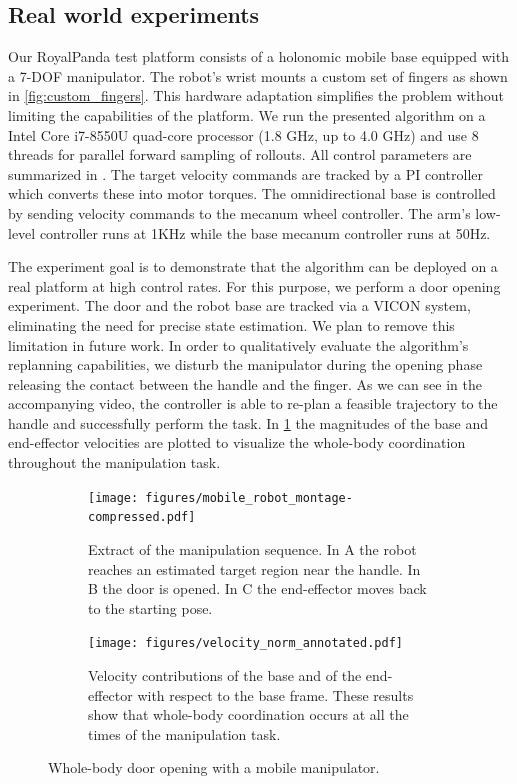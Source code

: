 \subsection{Real world experiments}
Our RoyalPanda test platform consists of a holonomic mobile base equipped with a 7-DOF manipulator. The robot's wrist mounts a custom set of fingers as shown in \fig\ref{fig:custom_fingers}. This hardware adaptation simplifies the problem without limiting the capabilities of the platform. We run the presented algorithm on a Intel Core i7-8550U quad-core processor (1.8 GHz, up to 4.0 GHz) and use 8 threads for parallel forward sampling of rollouts. All control parameters are summarized in \tab {}. The target velocity commands are tracked by a PI controller which converts these into motor torques. The omnidirectional base is controlled by sending velocity commands to the mecanum wheel controller. The arm's low-level controller runs at 1KHz while the base mecanum controller runs at 50Hz.


The experiment goal is to demonstrate that the algorithm can be deployed on a real platform at high control rates. For this purpose, we perform a door opening experiment. The door and the robot base are tracked via a VICON system, eliminating the need for precise state estimation. We plan to remove this limitation in future work. In order to qualitatively evaluate the algorithm's replanning capabilities, we disturb the manipulator during the opening phase releasing the contact between the handle and the finger. As we can see in the accompanying video, the controller is able to re-plan a feasible trajectory to the handle and successfully perform the task.     
In \fig\ref{fig:mobile_manipulation_hardware} the magnitudes of the base and end-effector velocities are plotted to visualize the whole-body coordination throughout the manipulation task.

\begin{figure}[t]
\centering
\begin{subfigure}{\columnwidth}
    \texttt{[image: figures/mobile\_robot\_montage-compressed.pdf]}
    \caption{Extract of the manipulation sequence. In A the robot reaches an estimated target region near the handle. In B the door is opened. In C the end-effector moves back to the starting pose.}
\end{subfigure}%
\hfill
\begin{subfigure}{\columnwidth}
    \texttt{[image: figures/velocity\_norm\_annotated.pdf]}
    \caption{Velocity contributions of the base and of the end-effector with respect to the base frame. These results show that whole-body coordination occurs at all the times of the manipulation task.}
\end{subfigure}%
\caption{Whole-body door opening with a mobile manipulator.} \label{fig:mobile_manipulation_hardware}
\end{figure}
